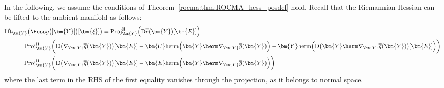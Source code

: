 In the following, we assume the conditions of Theorem~\ref{rocma:thm:ROCMA_hess_posdef} hold. 
Recall that the Riemannian Hessian can be lifted to the ambient manifold as follows:
\begin{align}
	&\mathrm{lift}_{\bm{Y}}\big(\Hess g \big([\bm{Y}]\big)[\bm{\xi}]\big)= \mathrm{Proj}_{\bm{Y}}^{\mathrm{H}}\Big(\mathrm{D}\overline{\overline{r}}(\bm{Y})[\bm{E}]\Big)\nonumber\\
	&\qquad= \mathrm{Proj}_{\bm{Y}}^{\mathrm{H}}\bigg(\mathrm{D}\big(\nabla_{\bm{Y}}\overline{\overline{g}}(\bm{Y})\big)[\bm{E}]
	-\bm{U}\mathrm{herm}\Big(\bm{Y}\herm\nabla_{\bm{Y}} \overline{\overline{g}}(\bm{Y})\Big)-\bm{Y}\mathrm{herm}\Big(\mathrm{D}\big(\bm{Y}\herm\nabla_{\bm{Y}} \overline{\overline{g}}(\bm{Y})\big)[\bm{E}]\Big)\bigg)\nonumber\\
	&\qquad= \mathrm{Proj}_{\bm{Y}}^{\mathrm{H}}\bigg(\mathrm{D}\big(\nabla_{\bm{Y}}\overline{\overline{g}}(\bm{Y})\big)[\bm{E}]
	-\bm{E}\mathrm{herm}\Big(\bm{Y}\herm\nabla_{\bm{Y}} \overline{\overline{g}}(\bm{Y})\Big)\bigg)\nonumber
\end{align}
where the last term in the RHS of the first equality vanishes through the projection, as it belongs to normal space. 

